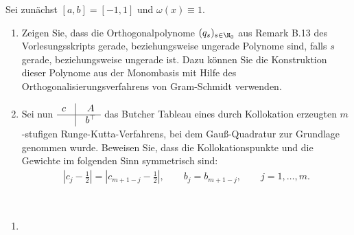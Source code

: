 \begin{exercise}
Sei zunächst $[a,b] = [-1,1]$ und $\omega(x) \equiv 1$.
\begin{enumerate}[label = \textbf{\alph*)}]
  \item Zeigen Sie, dass die Orthogonalpolynome $(q_s)_{s \in \N_0}$ aus Remark B.13
  des Vorlesungsskripts gerade, beziehungsweise ungerade Polynome sind, falls $s$
  gerade, beziehungsweise ungerade ist. Dazu können Sie die Konstruktion dieser
  Polynome aus der Monombasis mit Hilfe des Orthogonalisierungsverfahrens von
  Gram-Schmidt verwenden.
  \item
  \renewcommand{\arraystretch}{1.2}
  Sei nun ~$\begin{matrix}
    c & \vline & A \\
    \hline
    & \vline & b^{\top}
  \end{matrix}$~
  \renewcommand{\arraystretch}{1}
  das Butcher Tableau eines durch Kollokation erzeugten $m$-stufigen Runge-Kutta-Verfahrens,
  bei dem Gauß-Quadratur zur Grundlage genommen wurde. Beweisen Sie, dass die Kollokationspunkte
  und die Gewichte im folgenden Sinn symmetrisch sind:
  \begin{align}
    \left|c_j - \frac{1}{2}\right| = \left| c_{m + 1 - j} - \frac{1}{2}\right|,
    \qquad b_j = b_{m+1-j}, \qquad j = 1,\dots,m.
  \end{align}
\end{enumerate}
\end{exercise}
\begin{solution}
\leavevmode \\
\begin{enumerate}[label = \textbf{\alph*)}]
\item
\end{enumerate}
\end{solution}
